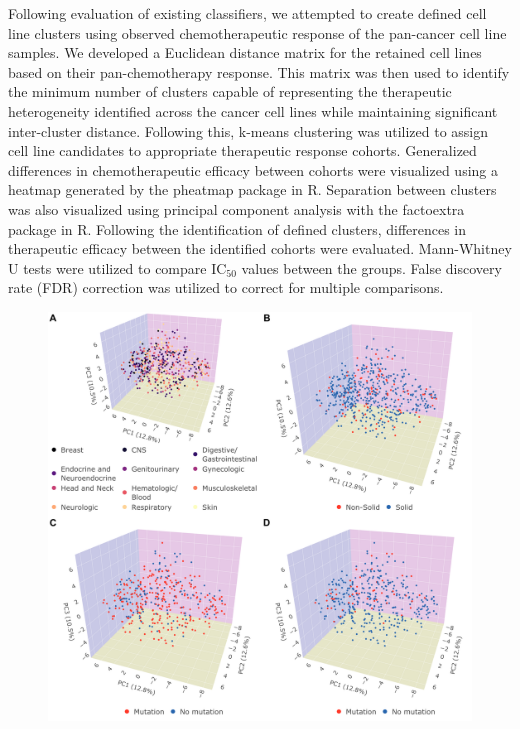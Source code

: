 \documentclass[10pt, letterpaper]{article}
\begin{document}
\begin{multicols*}{2}
Following evaluation of existing classifiers, we attempted to create defined cell line clusters using observed chemotherapeutic response of the pan-cancer cell line samples. We developed a Euclidean distance matrix for the retained cell lines based on their pan-chemotherapy response. This matrix was then used to identify the minimum number of clusters capable of representing the therapeutic heterogeneity identified across the cancer cell lines while maintaining significant inter-cluster distance. Following this, k-means clustering was utilized to assign cell line candidates to appropriate therapeutic response cohorts. Generalized differences in chemotherapeutic efficacy between cohorts were visualized using a heatmap generated by the pheatmap package \cite{pheatmap} in R. Separation between clusters was also visualized using principal component analysis with the factoextra package \cite{factoextra} in R. Following the identification of defined clusters, differences in therapeutic efficacy between the identified cohorts were evaluated. Mann-Whitney U tests were utilized to compare IC$_{50}$ values between the groups. False discovery rate (FDR) correction was utilized to correct for multiple comparisons.


\begin{figure}[!ht]
	\centering
    \includegraphics[width=\textwidth]{Figures/initial_pca.png}


\end{figure}
\end{multicols*}
\end{document}
